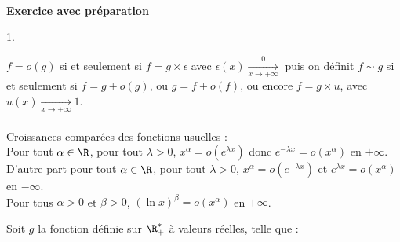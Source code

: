 \documentclass[11pt]{article}%
\begin{document}
 \begin{exercice} \indent \\
 \textbf{\underline{Exercice avec préparation}} \\
 \begin{noliste}{1.}
 \setlength{\itemsep}{4mm}
 \item $f = o(g)$ si et seulement si $ f = g \times \epsilon$ avec
$\epsilon (x) \xrightarrow[x \rightarrow + \infty] 0$ puis on définit
$f \sim g$ si et seulement si $f = g + o(g)$, ou $g = f + o(f)$, ou
encore $f = g \times u$, avec $u(x) \xrightarrow[x \rightarrow +
\infty]{} 1$. \\
\\
 Croissances comparées des fonctions usuelles : \\
 Pour tout $\alpha \in \R$, pour tout $\lambda > 0$, $x^{\alpha} = o
(e^{\lambda x} ) $ donc $e^{-\lambda x} = o ( x^{\alpha})$ en $ +
\infty$. \\
 D'autre part pour tout $\alpha \in \R$, pour tout $\lambda > 0$,
$x^{\alpha} = o (e^{-\lambda x} ) $ et $e^{\lambda x} = o (
x^{\alpha})$ en $-\infty$. \\
 Pour tous $\alpha >0$ et $\beta >0$, $( \ln x)^{\beta} = o (
x^{\alpha})$ en $ + \infty$. \\
 \item Soit $g$ la fonction définie sur $\R_+^*$ à valeurs réelles,
telle que :
 

\end{noliste}
\end{exercice}
\end{document}
